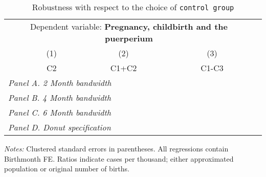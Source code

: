  \begin{table}[H] \begin{threeparttable} \centering \caption{Robustness with respect to the choice of \texttt{control group}} {\def\sym#1{\ifmmode^{#1}\else\(^{#1}\)\fi} \begin{tabular}{l*{4}{c}} \toprule \multicolumn{4}{c}{Dependent variable: \textbf{Pregnancy, childbirth and the puerperium}} \\ \cmidrule(lr){2-4}
            &\multicolumn{1}{c}{(1)}&\multicolumn{1}{c}{(2)}&\multicolumn{1}{c}{(3)}\\
            &\multicolumn{1}{c}{C2}&\multicolumn{1}{c}{C1+C2}&\multicolumn{1}{c}{C1-C3}\\
\midrule
 \multicolumn{4}{l}{\emph{Panel A. 2 Month bandwidth}} \\    \midrule\multicolumn{4}{l}{\emph{Panel B. 4 Month bandwidth}} \\    \midrule\multicolumn{4}{l}{\emph{Panel C. 6 Month bandwidth}} \\    \midrule\multicolumn{4}{l}{\emph{Panel D. Donut specification}} \\    
\bottomrule \end{tabular} } \begin{tablenotes} \item \scriptsize \emph{Notes:} Clustered standard errors in parentheses. All regressions contain Birthmonth FE. Ratios indicate cases per thousand; either approximated population or original number of births. \end{tablenotes} \end{threeparttable} \end{table} 
